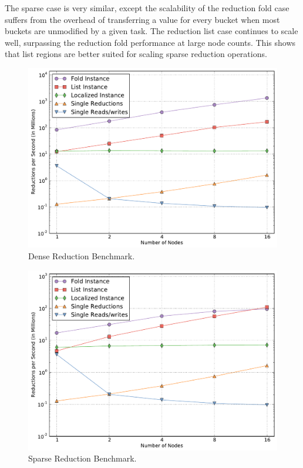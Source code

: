 The sparse case is very similar, except the scalability of the reduction fold case suffers from the
overhead of transferring a value for every bucket when most buckets are unmodified by a given task.
The reduction list case continues to scale well, surpassing the reduction fold performance at large
node counts.  This shows that
list regions are better suited for scaling sparse reduction operations.

\begin{figure}
\begin{center}
\includegraphics[scale=0.33]{figs/reduce_dense.pdf}
\end{center}
\vspace{-2mm}
\caption{Dense Reduction Benchmark.\label{fig:reducdense}}
\vspace{-4mm}
\end{figure}

\begin{figure}
\begin{center}
\includegraphics[scale=0.33]{figs/reduce_sparse.pdf}
\end{center}
\vspace{-2mm}
\caption{Sparse Reduction Benchmark.\label{fig:reducsparse}}
\vspace{-4mm}
\end{figure}

